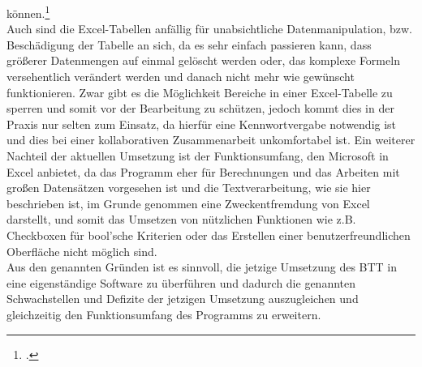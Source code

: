 können.\footcite[Vgl.][]{jemehrdesto}\\Auch sind die Excel-Tabellen anfällig für unabsichtliche Datenmanipulation, bzw. Beschädigung der Tabelle an sich, da es sehr einfach passieren kann, dass größerer Datenmengen auf einmal gelöscht werden oder, das komplexe Formeln versehentlich verändert werden und danach nicht mehr wie gewünscht funktionieren. Zwar gibt es die Möglichkeit Bereiche in einer Excel-Tabelle zu sperren und somit vor der Bearbeitung zu schützen, jedoch kommt dies in der Praxis nur selten zum Einsatz, da hierfür eine Kennwortvergabe notwendig ist und dies bei einer kollaborativen Zusammenarbeit unkomfortabel ist. Ein weiterer Nachteil der aktuellen Umsetzung ist der Funktionsumfang, den Microsoft in Excel anbietet, da das Programm eher für Berechnungen und das Arbeiten mit großen Datensätzen vorgesehen ist und die Textverarbeitung, wie sie hier beschrieben ist, im Grunde genommen eine Zweckentfremdung von Excel darstellt, und somit das Umsetzen von nützlichen Funktionen wie z.B. Checkboxen für bool'sche Kriterien oder das Erstellen einer benutzerfreundlichen Oberfläche nicht möglich sind.\\ Aus den genannten Gründen ist es sinnvoll, die jetzige Umsetzung des BTT in eine eigenständige Software zu überführen und dadurch die genannten Schwachstellen und Defizite der jetzigen Umsetzung auszugleichen und gleichzeitig den Funktionsumfang des Programms zu erweitern.






